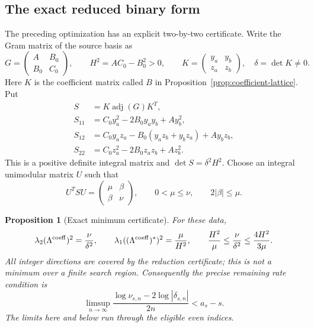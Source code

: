 \documentclass[11pt]{article}
\newtheorem{proposition}[theorem]{Proposition}
\theoremstyle{remark}
\begin{document}
\subsection{The exact reduced binary form}
The preceding optimization has an explicit two-by-two certificate.
Write the Gram matrix of the source basis as
\[
 G=\begin{pmatrix}A&B_0\\B_0&C_0\end{pmatrix},\qquad
 H^2=AC_0-B_0^2>0,
 \qquad K=\begin{pmatrix}y_a&y_b\\z_a&z_b\end{pmatrix},
 \quad\delta=\det K\ne0.
\]
Here \(K\) is the coefficient matrix called \(B\) in
Proposition~\ref{prop:coefficient-lattice}. Put
\begin{align*}
 S&=K\operatorname{adj}(G)K^T,\\
 S_{11}&=C_0y_a^2-2B_0y_ay_b+Ay_b^2,\\
 S_{12}&=C_0y_az_a-B_0(y_az_b+y_bz_a)+Ay_bz_b,\\
 S_{22}&=C_0z_a^2-2B_0z_az_b+Az_b^2.
\end{align*}
This is a positive definite integral matrix and
\(\det S=\delta^2H^2\). Choose an integral unimodular matrix \(U\)
such that
\[
 U^TSU=\begin{pmatrix}\mu&\beta\\\beta&\nu\end{pmatrix},\qquad
 0<\mu\le\nu,\qquad 2|\beta|\le\mu.
\]
\begin{proposition}[Exact minimum certificate]
\label{prop:binary-minimum}
For these data,
\begin{equation}
 \lambda_2(\Lambda^{\rm coeff})^2=\frac\nu{\delta^2},\qquad
 \lambda_1((\Lambda^{\rm coeff})^*)^2=\frac\mu{H^2},
 \qquad
 \frac{H^2}{\mu}\le\frac\nu{\delta^2}
                 \le\frac{4H^2}{3\mu}.
 \label{eq:binary-minima}
\end{equation}
All integer directions are covered by the reduction certificate; this is
not a minimum over a finite search region. Consequently the precise
remaining rate condition is
\begin{equation}
 \limsup_{n\to\infty}
 \frac{\log\nu_{s,n}-2\log|\delta_{s,n}|}{2n}<a_s-s.
 \label{eq:binary-rate}
\end{equation}
The limits here and below run through the eligible even indices.
\end{proposition}
\end{document}

